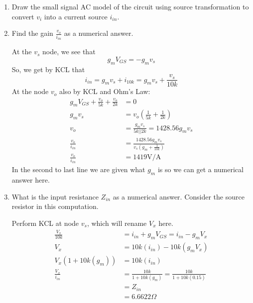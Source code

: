 \begin{enumerate}
    
    
    \begin{enumerate}
        \item Draw the small signal AC model of the circuit using source transformation to convert $v_i$ into a current source $i_{in}$.
        \begin{Ans}
            
        \end{Ans}

        \item Find the gain $\frac{v_o}{i_{in}}$ as a numerical answer.
        \begin{Ans}
            At the $v_s$ node, we see that 
                \[g_m V_{GS} = -g_m v_s\]
            So, we get by KCL that 
                \[i_{in} = g_m v_s + i_{10k} = g_m v_s + \frac{v_s}{10k}\]
            At the node $v_o$ also by KCL and Ohm's Law:
            \begin{align*}
                g_m V_{GS} + \frac{v_o}{5k} + \frac{v_o}{2k} &= 0 \\
                g_m v_s &= v_o (\frac{1}{5k} + \frac{1}{2k}) \\
                v_o &= \frac{g_m v_s}{5k || 2k} = 1428.56 g_m v_s \\
                \frac{v_o}{i_{in}} &= \frac{1428.56 g_m v_s}{v_s (g_m + \frac{1}{10k})} \\
                \frac{v_o}{i_{in}} &= 1419 \mathrm{V/A}
            \end{align*}
            In the second to last line we are given what $g_m$ is so we can get a numerical answer here.
        \end{Ans}

        \item What is the input resistance $Z_{in}$ as a numerical answer. Consider the source resistor in this computation.
        \begin{Ans}
            Perform KCL at node $v_s$, which will rename $V_x$ here.
            \begin{align*}
                \frac{V_x}{10k} &= i_{in} + g_m V_{GS} = i_{in} - g_m V_x \\
                V_x &= 10k(i_{in}) - 10k(g_m V_x) \\
                V_x (1 + 10k(g_m)) &= 10k(i_{in}) \\
                \frac{V_x}{i_{in}} &= \frac{10k}{1+10k(g_m)} = \frac{10k}{1+10k(0.15)} \\
                &= Z_{in} \\
                &= 6.6622 \Omega
            \end{align*}
        \end{Ans}
    \end{enumerate}
\end{enumerate}
